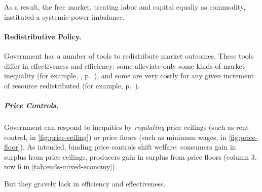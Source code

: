 As a result, the free market, treating labor and capital equally as commodity, instituted a systemic power imbalance.


\paragraph{Redistributive Policy.}
	\label{sec:redistributive-policy}
Government has a number of tools to redistribute market outcomes.
These tools differ in effectiveness and efficiency:
some alleviate only some kinds of market inequality (for example, ,  p.~\pageref{sec:affirmative-action}), and some are very costly for any given increment of resource redistributed (for example,  p.~\pageref{sec:price-controls}).

\subparagraph{Price Controls.}
	\label{sec:price-controls}
Government can respond to inequities by \emph{regulating} price ceilings (such as rent control, in \autoref{fig:price-ceiling}) or price floors (such as minimum wages, in \autoref{fig:price-floor}).
As intended, binding price controls shift welfare:
consumers gain in surplus from price ceilings, producers gain in surplus from price floors (column 3, row 6 in \autoref{tab:ends-mixed-economy}).

But they gravely lack in efficiency and effectiveness.

